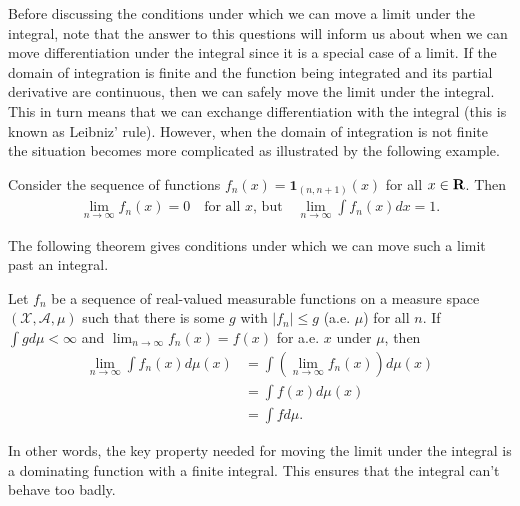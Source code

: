 \documentclass[twoside]{article}
\begin{document}
Before discussing the conditions under which we can move a limit under the
integral, note that the answer to this questions will inform us about when we
can move differentiation under the integral since it is a special case of a
limit.  If the domain of integration is finite and the function being
integrated and its partial derivative are continuous, then we can safely move
the limit under the integral.  This in turn means that we can exchange
differentiation with the integral (this is known as Leibniz' rule).  However,
when the domain of integration is not finite the situation becomes more
complicated as illustrated by the following example.

\begin{example}
Consider the sequence of functions $f_n(x) = \mathbf{1}_{(n, n+1)}(x)$ for all
$x \in \mathbf{R}$.  Then
\begin{align*}
  \lim_{n \rightarrow \infty} f_n(x) = 0 \quad \text{for all $x$, but} \quad
  \lim_{n \rightarrow \infty} \int f_n(x) dx = 1.
\end{align*}
\end{example}

The following theorem gives conditions under which we can move such a limit
past an integral.

\begin{theorem}\citep[Theorem 2.5, p.~29]{keener}
  Let ${f_n}$ be a sequence of real-valued measurable functions on a
  measure space $(\mathcal X, \mathcal A, \mu)$ such that there is some
  $g$ with $|f_n| \le g$ (a.e. $\mu$) for all $n$.  If $\int g d\mu < \infty$
  and $\lim_{n \rightarrow \infty} f_n(x) = f(x)$ for a.e. $x$ under $\mu$,
  then
  \begin{align*}
    \lim_{n \rightarrow \infty} \int f_n(x) d\mu(x) &= \int
      \left(\lim_{n \rightarrow \infty} f_n(x) \right) d\mu(x) \\
       &= \int f(x) d\mu(x) \\
       &= \int f d\mu.
  \end{align*} 
\end{theorem}

In other words, the key property needed for moving the limit under the integral
is a dominating function with a finite integral.  This ensures that the integral
can't behave too badly.
\end{document}
